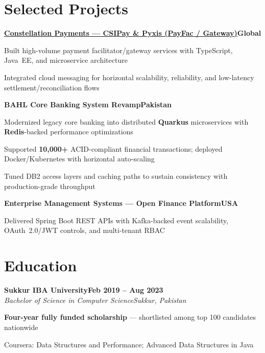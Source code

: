 \documentclass[letterpaper,10pt]{article}
\newcommand{\heading}[2]{
  \hspace{8pt}#1\hfill#2\\
}
\newcommand{\headingBf}[2]{
  \heading{\textbf{#1}}{\textbf{#2}}
}
\newcommand{\headingIt}[2]{
  \heading{\textit{#1}}{\textit{#2}}
}
\newenvironment{resume_list}{
  \vspace{-6pt}
  \begin{itemize}[itemsep=-1px, parsep=0.5pt, topsep=1pt, leftmargin=22pt]
}{
  \end{itemize}
  \vspace{-2pt}
}
\begin{document}
\section{Selected Projects}

\headingBf{\href{https://www.constellationpayments.com/}{Constellation Payments --- CSIPay \& Pyxis (PayFac / Gateway)}}{Global}
\begin{resume_list}
  \item Built high-volume payment facilitator/gateway services with TypeScript, Java~EE, and microservice architecture
  \item Integrated cloud messaging for horizontal scalability, reliability, and low-latency settlement/reconciliation flows
\end{resume_list}

\vspace{2pt}
\headingBf{BAHL Core Banking System Revamp}{Pakistan}
\begin{resume_list}
  \item Modernized legacy core banking into distributed \textbf{Quarkus} microservices with \textbf{Redis}-backed performance optimizations
  \item Supported \textbf{10,000+} ACID-compliant financial transactions; deployed Docker/Kubernetes with horizontal auto-scaling
  \item Tuned DB2 access layers and caching paths to sustain consistency with production-grade throughput
\end{resume_list}

\vspace{2pt}
\headingBf{Enterprise Management Systems --- Open Finance Platform}{USA}
\begin{resume_list}
  \item Delivered Spring Boot REST APIs with Kafka-backed event scalability, OAuth~2.0/JWT controls, and multi-tenant RBAC
\end{resume_list}

\section{Education}
\headingBf{Sukkur IBA University}{Feb 2019 -- Aug 2023}
\headingIt{Bachelor of Science in Computer Science}{Sukkur, Pakistan}
\begin{resume_list}
  \item \textbf{Four-year fully funded scholarship} --- shortlisted among top 100 candidates nationwide
  \item Coursera: Data Structures and Performance; Advanced Data Structures in Java
\end{resume_list}
\end{document}
